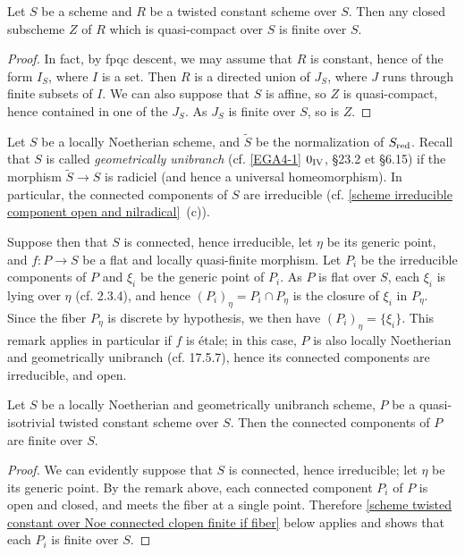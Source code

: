\begin{lemma}\label{scheme twisted constant group qc closed is finite}
Let $S$ be a scheme and $R$ be a twisted constant scheme over $S$. Then any closed subscheme $Z$ of $R$ which is quasi-compact over $S$ is finite over $S$.
\end{lemma}
\begin{proof}
In fact, by fpqc descent, we may assume that $R$ is constant, hence of the form $I_S$, where $I$ is a set. Then $R$ is a directed union of $J_S$, where $J$ runs through finite subsets of $I$. We can also suppose that $S$ is affine, so $Z$ is quasi-compact, hence contained in one of the $J_S$. As $J_S$ is finite over $S$, so is $Z$.
\end{proof}

Let $S$ be a locally Noetherian scheme, and $\widetilde{S}$ be the normalization of $S_{\mathrm{red}}$. Recall that $S$ is called \textit{geometrically unibranch} (cf. \cref{EGA4-1} $0_{\Rmnum{4}}$, \S 23.2 et \cite{EGA4-2} \S 6.15) if the morphism $\widetilde{S}\to S$ is radiciel (and hence a universal homeomorphism). In particular, the connected components of $S$ are irreducible (cf. \cref{scheme irreducible component open and nilradical}~(c)).\par
Suppose then that $S$ is connected, hence irreducible, let $\eta$ be its generic point, and $f:P\to S$ be a flat and locally quasi-finite morphism. Let $P_i$ be the irreducible components of $P$ and $\xi_i$ be the generic point of $P_i$. As $P$ is flat over $S$, each $\xi_i$ is lying over $\eta$ (cf. \cite{EGA4-2} 2.3.4), and hence $(P_i)_\eta=P_i\cap P_\eta$ is the closure of $\xi_i$ in $P_\eta$. Since the fiber $P_\eta$ is discrete by hypothesis, we then have $(P_i)_\eta=\{\xi_i\}$. This remark applies in particular if $f$ is \'etale; in this case, $P$ is also locally Noetherian and geometrically unibranch (cf. \cite{EGA4-4} 17.5.7), hence its connected components are irreducible, and open.

\begin{corollary}\label{scheme twisted constant group over Noe geo.uni connected component finite}
Let $S$ be a locally Noetherian and geometrically unibranch scheme, $P$ be a quasi-isotrivial twisted constant scheme over $S$. Then the connected components of $P$ are finite over $S$.
\end{corollary}
\begin{proof}
We can evidently suppose that $S$ is connected, hence irreducible; let $\eta$ be its generic point. By the remark above, each connected component $P_i$ of $P$ is open and closed, and meets the fiber at a single point. Therefore \cref{scheme twisted constant over Noe connected clopen finite if fiber} below applies and shows that each $P_i$ is finite over $S$.
\end{proof}

